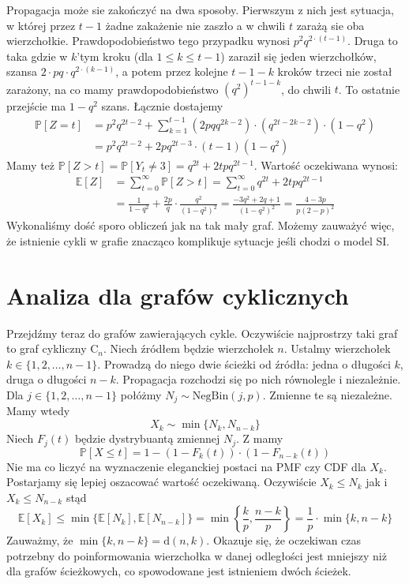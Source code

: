 Propagacja może sie zakończyć na dwa sposoby. Pierwszym z nich jest sytuacja, w której przez $t-1$ żadne zakażenie nie zaszło a w chwili $t$ zarażą sie oba wierzchołkie. Prawdopodobieństwo tego przypadku wynosi $p^2q^{2\cdot(t-1)}$. Druga to taka gdzie w $k$'tym kroku (dla $1\le k\le t-1$) zaraził się jeden wierzchołków, szansa $2\cdot pq\cdot q^{2\cdot(k-1)}$,  a potem przez kolejne $t-1-k$ kroków trzeci nie został zarażony, na co mamy prawdopodobieństwo $(q^2)^{t-1-k}$, do chwili $t$. To ostatnie przejście ma $1-q^2$ szans. Łącznie dostajemy
\begin{equation*}
\begin{aligned}
\mathbb{P}[Z=t]
&=p^2q^{2t-2}+\sum_{k=1}^{t-1} (2pqq^{2k-2})\cdot (q^{2t-2k-2}) \cdot (1-q^2) \\
&=p^2q^{2t-2}+2pq^{2t-3}\cdot(t-1)(1-q^2) 
\end{aligned}
\end{equation*}
Mamy też $\mathbb{P}[Z>t]=\mathbb{P}[Y_t\ne 3] = q^{2t}+2tpq^{2t-1}$. Wartość oczekiwana wynosi:
\begin{equation*}
\begin{aligned}
\mathbb{E}[Z]
&=\sum_{t=0}^{\infty} \mathbb{P}[Z>t]=\sum_{t=0}^{\infty} q^{2t}+2tpq^{2t-1} \\
&=\frac{1}{1-q^2}+\frac{2p}{q}\cdot \frac{q^2}{(1-q^2)^2}=\frac{-3q^2+2q+1}{(1-q^2)^2}=\frac{4-3p}{p(2-p)^2}
\end{aligned}
\end{equation*}
Wykonaliśmy dość sporo obliczeń jak na tak mały graf. Możemy zauważyć więc, że istnienie cykli w grafie znacząco komplikuje sytuacje jeśli chodzi o model SI. 

\section{Analiza dla grafów cyklicznych}

Przejdźmy teraz do grafów zawierających cykle. Oczywiście najprostrzy taki graf to graf cykliczny $\mathrm{C}_n$. Niech źródłem będzie wierzchołek $n$. Ustalmy wierzchołek $k\in\{1,2,\dots,n-1\}$. Prowadzą do niego dwie ścieżki od źródła: jedna o długości $k$, druga o długości $n-k$. Propagacja rozchodzi się po nich równolegle i niezależnie. Dla $j\in \{1,2,\dots,n-1\} $ połóżmy $N_j\sim \mathrm{NegBin}(j,p)$. Zmienne te są niezależne. Mamy wtedy 
\[
    X_k \sim \min\{N_k, N_{n-k}\}
\]
Niech $F_j(t)$ będzie dystrybuantą zmiennej $N_j$. Z  mamy 
\[
    \mathbb{P}[X\le t] = 1 - (1-F_k(t))\cdot(1-F_{n-k}(t))
\]
Nie ma co liczyć na wyznaczenie eleganckiej postaci na PMF czy CDF dla $X_k$. Postarjamy się lepiej oszacować wartość oczekiwaną. Oczywiście $X_k\le N_k$ jak i $X_k\le N_{n-k}$ stąd
\[
    \mathbb{E}[X_k]\le\min\{\mathbb{E}[N_k], \mathbb{E}[N_{n-k}]\} = \min\left\{\frac{k}{p}, \frac{n-k}{p}\right\}=\frac{1}{p}\cdot \min\{k,n-k\}
\]
Zauważmy, że $\min\{k,n-k\}=\mathrm{d}(n,k)$. Okazuje się, że oczekiwan czas potrzebny do poinformowania wierzchołka w danej odległości jest mniejszy niż dla grafów ścieżkowych, co spowodowane jest istnieniem dwóch ścieżek.


